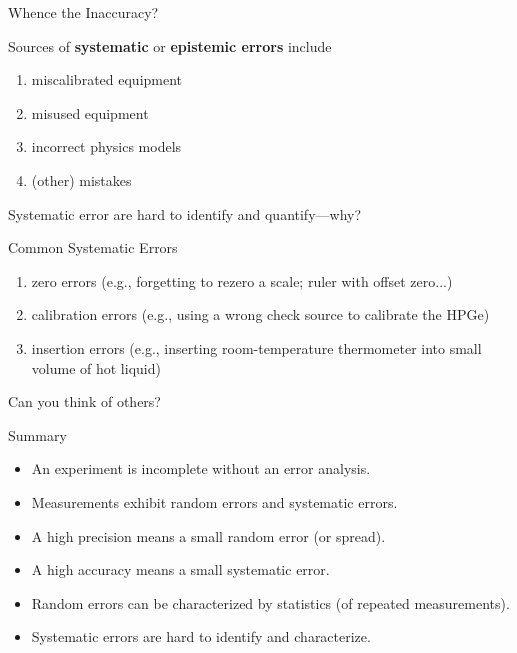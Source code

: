 \documentclass[aspectratio=1610]{beamer}
\begin{document}
\begin{frame}{Whence the Inaccuracy?}

Sources of {\bf systematic} or {\bf epistemic  errors} include
\begin{enumerate}
 \item miscalibrated equipment
 \item misused equipment
 \item incorrect physics models
 \item (other) mistakes
\end{enumerate}

\vfill
\pause

Systematic error are hard to identify and quantify---why?


\end{frame}


\begin{frame}{Common Systematic Errors}


\begin{enumerate}
 \item zero errors (e.g., forgetting to rezero a scale; ruler with offset zero...)
 \item calibration errors (e.g., using a wrong check source to calibrate the HPGe)
 \item insertion errors (e.g., inserting room-temperature thermometer into small volume of hot liquid)
\end{enumerate}

\vfill

Can you think of others?

\vfill

\end{frame}


\begin{frame}{Summary}

\begin{itemize}
 \item An experiment is incomplete without an error analysis.
 \item Measurements exhibit random errors and systematic errors.
 \item A high precision means a small random error (or spread).
 \item A high accuracy means a small systematic error.
 \item Random errors can be characterized by statistics (of repeated measurements).
 \item Systematic errors are hard to identify and characterize.
\end{itemize}


\end{frame}
\end{document}
